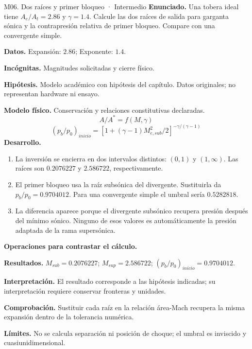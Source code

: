 \begin{studiumworked}{M06. Dos raíces y primer bloqueo · Intermedio}
\textbf{Enunciado.} Una tobera ideal tiene $A_e/A_t=2.86$ y $\gamma=1.4$. Calcule las dos raíces de salida para garganta sónica y la contrapresión relativa de primer bloqueo. Compare con una convergente simple.

\textbf{Datos.} Expansión: $2.86$; Exponente: $1.4$.

\textbf{Incógnitas.} Magnitudes solicitadas y cierre físico.

\textbf{Hipótesis.} Modelo académico con hipótesis del capítulo. Datos originales; no representan hardware ni ensayo.

\textbf{Modelo físico.} Conservación y relaciones constitutivas declaradas.
\[A/A^*=f(M,\gamma)\]
\[(p_b/p_0)_{inicio}=[1+(\gamma-1)M_{e,sub}^2/2]^{-\gamma/(\gamma-1)}\]
\textbf{Desarrollo.}
\begin{enumerate}
\item La inversión se encierra en dos intervalos distintos: $(0,1)$ y $(1,\infty)$. Las raíces son $0.2076227$ y $2.586722$, respectivamente.
\item El primer bloqueo usa la raíz subsónica del divergente. Sustituirla da $p_b/p_0=0.9704012$. Para una convergente simple el umbral sería $0.5282818$.
\item La diferencia aparece porque el divergente subsónico recupera presión después del mínimo sónico. Ninguno de esos valores es automáticamente la presión adaptada de la rama supersónica.
\end{enumerate}
\textbf{Operaciones para contrastar el cálculo.}

\textbf{Resultados.} $M_{sub}=0.2076227$; $M_{sup}=2.586722$; $(p_b/p_0)_{inicio}=0.9704012$.

\textbf{Interpretación.} El resultado corresponde a las hipótesis indicadas; su interpretación requiere conservar fronteras y unidades.

\textbf{Comprobación.} Sustituir cada raíz en la relación área-Mach recupera la misma expansión dentro de la tolerancia numérica.

\textbf{Límites.} No se calcula separación ni posición de choque; el umbral es inviscido y cuasiunidimensional.
\end{studiumworked}
